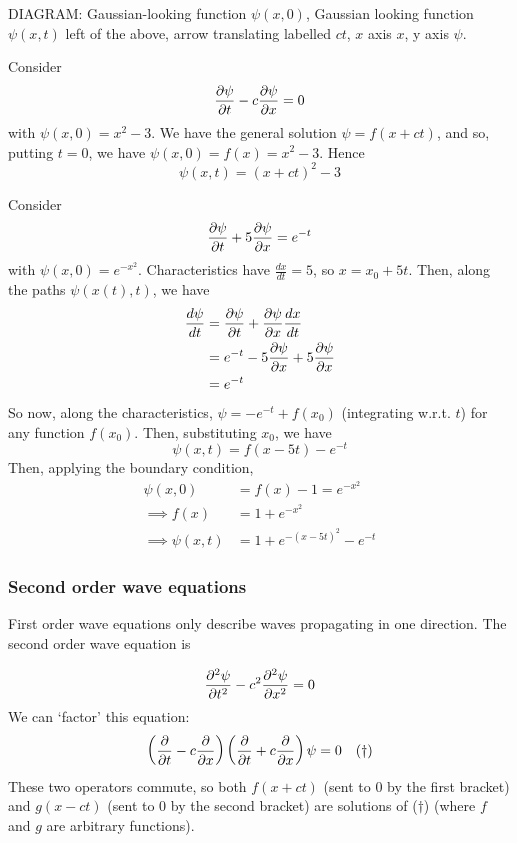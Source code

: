 \documentclass{../template/note}
\begin{document}
    DIAGRAM:
    Gaussian-looking function \(\psi(x, 0)\), Gaussian looking function \(\psi(x, t)\) left of the above, arrow translating labelled \(ct\), \(x\) axis \(x\), y axis \(\psi\).

    \begin{example}
        Consider
        \[
            \pd \psi t - c \pd \psi x = 0
        \]
        with \(\psi(x, 0) = x^2-3\). We have the general solution \(\psi = f(x + ct)\), and so, putting \(t=0\), we have \(\psi(x, 0) = f(x) = x^2-3\). Hence
        \[
            \psi(x, t) = (x+ct)^2-3
        \]
    \end{example}
    
    \begin{example}
        Consider
        \[
            \pd \psi t + 5 \pd \psi x = e^{-t}
        \]
        with \(\psi(x, 0) = e^{-x^2}\). Characteristics have \(\frac{dx}{dt} = 5\), so \(x = x_0 + 5t\). Then, along the paths \(\psi(x(t), t)\), we have
        \begin{align*}
            \frac{d\psi}{dt} &= \pd \psi t + \pd \psi x \frac{dx}{dt} \\
            &= e^{-t} - 5 \pd \psi x + 5 \pd \psi x \\
            &= e^{-t}
        \end{align*}
        So now, along the characteristics, \(\psi = -e^{-t} + f(x_0)\) (integrating w.r.t. \(t\)) for any function \(f(x_0)\). Then, substituting \(x_0\), we have
        \[
            \psi(x, t) = f(x - 5t) - e^{-t}
        \]
        Then, applying the boundary condition,
        \begin{align*}
            \psi(x, 0) &= f(x) - 1 = e^{-x^2} \\
            \implies f(x) &= 1 + e^{-x^2} \\
            \implies \psi(x, t) &= 1 + e^{-(x-5t)^2} - e^{-t}
        \end{align*}
    \end{example}
    
    \subsubsection{Second order wave equations}

    First order wave equations only describe waves propagating in one direction. The second order wave equation is

    \[
        \pd {^2\psi}{t^2} - c^2 \pd{^2\psi}{x^2} = 0
    \]
    We can `factor' this equation:
    \begin{align*}
        \left(\pd{}{t} - c \pd{}{x}\right)\left(\pd{}{t} + c \pd{}{x}\right)\psi = 0 && (\dagger)
    \end{align*}
    These two operators commute, so both \(f(x + ct)\) (sent to 0 by the first bracket) and \(g(x - ct)\) (sent to 0 by the second bracket) are solutions of (\(\dagger\)) (where \(f\) and \(g\) are arbitrary functions).
\end{document}
